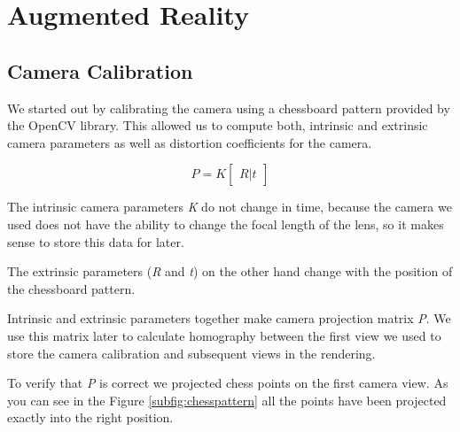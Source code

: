 \section{Augmented Reality}
\subsection{Camera Calibration}
We started out by calibrating the camera using a chessboard pattern provided by the OpenCV library. This allowed us to compute both, intrinsic and extrinsic camera parameters as well as distortion coefficients for the camera. 

\begin{equation}
	P = K \begin{bmatrix} R|t \end{bmatrix}
\end{equation}

The intrinsic camera parameters \textit{K} do not change in time, because the camera we used does not have the ability to change the focal length of the lens, so it makes sense to store this data for later. 

The extrinsic parameters (\textit{R} and \textit{t}) on the other hand change with the position of the chessboard pattern.

Intrinsic and extrinsic parameters together make camera projection matrix \textit{P}. We use this matrix later to calculate homography between the first view we used to store the camera calibration and subsequent views in the rendering.

To verify that \textit{P} is correct we projected chess points on the first camera view. As you can see in the Figure \ref{subfig:chesspattern} all the points have been projected exactly into the right position.
 
